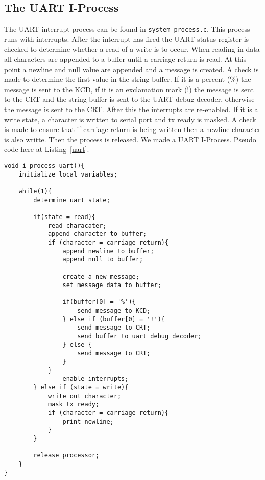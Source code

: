 \documentclass[oneside]{article}
\begin{document}
\subsection*{The UART I-Process}
The UART interrupt process can be found in \texttt{system\_process.c}. This process runs with 
interrupts. After the interrupt has fired the UART status register is checked to 
determine whether a read of a write is to occur. When reading in data all characters are appended 
to a buffer until a carriage return is read. At this point a newline and null value are appended 
and a message is created. A check is made to determine the first value in the string buffer. If 
it is a percent (\%) the message is sent to the KCD, if it is an exclamation mark (!) the message 
is sent to the CRT and the string buffer is sent to the UART debug decoder, otherwise the message 
is sent to the CRT. After this the interrupts are re-enabled. If it is a write state, a character is 
written to serial port and tx ready is masked. A check is made to ensure that if carriage return is being 
written then a newline character is also writte. Then the process is released.
We made a UART I-Process. Pseudo code here at Listing~\ref{uart}.

\begin{lstlisting}
void i_process_uart(){
    initialize local variables;

    while(1){
        determine uart state;

        if(state = read){
            read characater;
            append character to buffer;
            if (character = carriage return){
                append newline to buffer;
                append null to buffer;
                
                create a new message;
                set message data to buffer;

                if(buffer[0] = '%'){
                    send message to KCD;                
                } else if (buffer[0] = '!'){
                    send message to CRT;
                    send buffer to uart debug decoder;
                } else {
                    send message to CRT;
                }
            }
                enable interrupts;
        } else if (state = write){
            write out character;
            mask tx ready;
            if (character = carriage return){
                print newline;
            }
        }
    
        release processor;
    }
}
\end{lstlisting}
\end{document}
